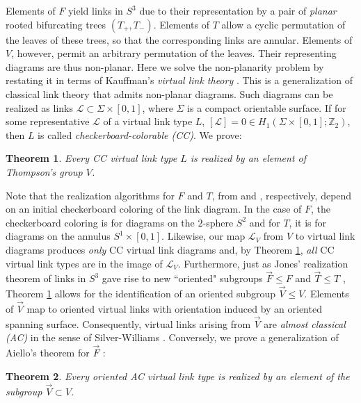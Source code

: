 \documentclass[11pt, twoside]{amsart}
\numberwithin{equation}{section}
\newtheorem{thm}{Theorem}
\theoremstyle{definition}
\numberwithin{equation}{section}
\begin{document}
Elements of $F$ yield links in $S^3$ due to their representation by a pair of \emph{planar} rooted bifurcating trees $(T_+,T_-)$. Elements of $T$ allow a cyclic permutation of the leaves of these trees, so that the corresponding links are annular. Elements of $V$, however, permit an arbitrary permutation of the leaves. Their representing diagrams are thus non-planar. Here we solve the non-planarity problem by restating it in terms of Kauffman's \emph{virtual link theory} \cite{kauffman_vkt}. This is a generalization of classical link theory that admits non-planar diagrams. Such diagrams can be realized as links $\mathcal{L} \subset \Sigma \times [0,1]$, where $\Sigma$ is a compact orientable surface. If for some representative $\mathcal{L}$ of a virtual link type $L$, $[\mathcal{L}]=0 \in H_1(\Sigma \times [0,1];\mathbb{Z}_2)$, then $L$ is called \emph{checkerboard-colorable (CC)}. We prove:

\begin{thm} \label{thm_intro_real} Every CC virtual link type $L$ is realized by an element of Thompson's group $V$. \end{thm} 

Note that the realization algorithms for $F$ and $T$, from \cite{jones_unitary} and \cite{LL25}, respectively, depend on an initial checkerboard coloring of the link diagram. In the case of $F$, the checkerboard coloring is for diagrams on the $2$-sphere $S^2$ and for $T$, it is for diagrams on the annulus $S^1 \times [0,1]$. Likewise, our map $\mathscr{L}_V$ from $V$ to virtual link diagrams produces \emph{only} CC virtual link diagrams and, by Theorem \ref{thm_intro_real}, \emph{all} CC virtual link types are in the image of $\mathscr{L}_V$. Furthermore, just as Jones' realization theorem of links in $S^3$ gave rise to new ``oriented" subgroups $\vec{F} \leq F$ and $\vec{T} \leq T$ \cite{jones_unitary}, Theorem \ref{thm_intro_real} allows for the identification of an oriented subgroup $\vec{V} \leq V$. Elements of $\vec{V}$ map to oriented virtual links with orientation induced by an oriented spanning surface. Consequently, virtual links arising from $\vec{V}$ are \emph{almost classical (AC)} in the sense of Silver-Williams \cite{silver_williams}. Conversely, we prove a generalization of Aiello's theorem for $\vec{F}$ \cite{aiello_oriented}:

\begin{thm} \label{thm_intro_oriented} Every oriented AC virtual link type is realized by an element of the subgroup $\vec{V} \subset V$. 
\end{thm}
\end{document}
